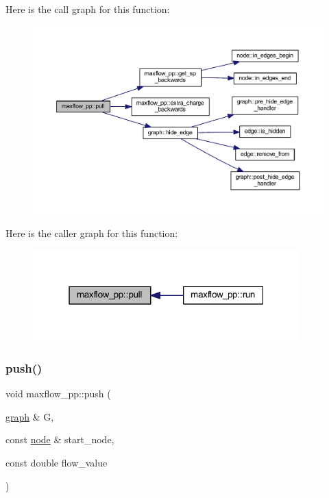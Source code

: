 Here is the call graph for this function\+:\nopagebreak
\begin{figure}[H]
\begin{center}
\leavevmode
\includegraphics[width=350pt]{classmaxflow__pp_aba2aefadd6dde920b8b8aa44af95ad9b_cgraph}
\end{center}
\end{figure}
Here is the caller graph for this function\+:\nopagebreak
\begin{figure}[H]
\begin{center}
\leavevmode
\includegraphics[width=292pt]{classmaxflow__pp_aba2aefadd6dde920b8b8aa44af95ad9b_icgraph}
\end{center}
\end{figure}
\mbox{\label{classmaxflow__pp_ae7c9ce8d1cad511d70022e2f62567590}} 
\subsubsection{\texorpdfstring{push()}{push()}}
{\footnotesize\ttfamily void maxflow\+\_\+pp\+::push (\begin{DoxyParamCaption}\item[{\mbox{\hyperlink{classgraph}{graph}} \&}]{G,  }\item[{const \mbox{\hyperlink{classnode}{node}} \&}]{start\+\_\+node,  }\item[{const double}]{flow\+\_\+value }\end{DoxyParamCaption})\hspace{0.3cm}{\ttfamily [protected]}}




